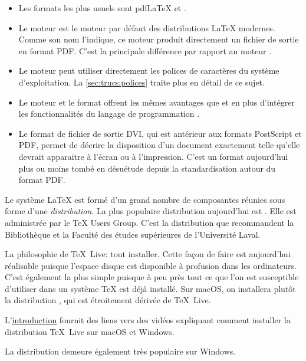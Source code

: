 \begin{itemize}
\item Les formats les plus usuels sont pdf{\LaTeX} et {\XeLaTeX}.
\item Le moteur  est le moteur par défaut des
  distributions {\LaTeX} modernes. Comme son nom l'indique, ce moteur
  produit directement un fichier de sortie en format PDF. C'est la
  principale différence par rapport au moteur .
\item Le moteur  peut utiliser directement les polices de
  caractères du système d'exploitation. La \autoref{sec:trucs:polices}
  traite plus en détail de ce sujet.
\item Le moteur  et le format {\LuaLaTeX} offrent les mêmes
  avantages que  et {\XeLaTeX} en plus d'intégrer les
  fonctionnalités du langage de programmation
  .
\item Le format de fichier de sortie DVI, qui est antérieur aux
  formats PostScript et PDF, permet de décrire la disposition d'un
  document exactement telle qu'elle devrait apparaitre à l'écran ou à
  l'impression. C'est un format aujourd'hui plus ou moins tombé en
  désuétude depuis la standardisation autour du format PDF.
\end{itemize}

Le système {\LaTeX} est formé d'un grand nombre de composantes réunies
sous forme d'une \emph{distribution}. La plus populaire distribution
aujourd'hui est %
. %
Elle est administrée par le {\TeX} Users Group. C'est la distribution que
recommandent la Bibliothèque et la Faculté des études supérieures de
l'Université Laval.

La philosophie de {\TeX}~Live: tout installer. Cette façon de faire
est aujourd'hui réalisable puisque l'espace disque est disponible à
profusion dans les ordinateurs. C'est également la plus simple puisque
à peu près tout ce que l'on est susceptible d'utiliser dans un système
{\TeX} est déjà installé. Sur macOS, on installera plutôt la
distribution %
, %
qui est étroitement dérivée de {\TeX}~Live.

L'\hyperref[chap:introduction]{introduction} fournit des liens vers
des vidéos expliquant comment installer la distribution {\TeX}~Live
sur macOS et Windows.

La distribution %
demeure également très populaire sur Windows.

